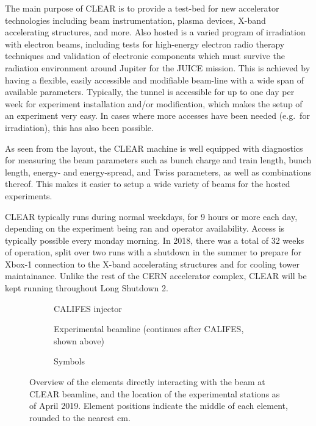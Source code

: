 \documentclass[a4paper,
               keeplastbox,   %
               ]{jacow}
\begin{document}
The main purpose of CLEAR is to provide a test-bed for new accelerator technologies including beam instrumentation, plasma devices, X-band accelerating structures, and more.
Also hosted is a varied program of irradiation with electron beams, including tests for high-energy electron radio therapy techniques and validation of electronic components which must survive the radiation environment around Jupiter for the JUICE mission.
This is achieved by having a flexible, easily accessible and modifiable beam-line with a wide span of available parameters.
Typically, the tunnel is accessible for up to one day per week for experiment installation and/or modification, which makes the setup of an experiment very easy.
In cases where more accesses have been needed (e.g.\ for irradiation), this has also been possible.


As seen from the layout, the CLEAR machine is well equipped with diagnostics for measuring the beam parameters such as bunch charge and train length, bunch length, energy- and energy-spread, and Twiss parameters, as well as combinations thereof.
This makes it easier to setup a wide variety of beams for the hosted experiments.

CLEAR typically runs during normal weekdays, for 9 hours or more each day, depending on the experiment being ran and operator availability.
Access is typically possible every monday morning.
In 2018, there was a total of 32 weeks of operation, split over two runs with a shutdown in the summer to prepare for Xbox-1 connection to the X-band accelerating structures and for cooling tower maintainance.
Unlike the rest of the CERN accelerator complex, CLEAR will be kept running throughout Long Shutdown 2.

\begin{figure*}[t]
  \centering
  \begin{subfigure}{\textwidth}
    \centering
    
    \vspace{-2.5em} %
    \caption{CALIFES injector}
  \end{subfigure}
  \begin{subfigure}{\textwidth}
    \centering
    \vspace{-1em}
    
    \vspace{-0.5em}
    \caption{Experimental beamline
      (continues after CALIFES, shown above)}
  \end{subfigure}
  \begin{subfigure}{\textwidth}
    \centering
    \vspace{-0.5em}
    
    \vspace{-2em} %
    \caption{Symbols}
  \end{subfigure}
  \caption{Overview of the elements directly interacting with the beam at CLEAR beamline, and the location of the experimental stations as of April 2019. Element positions indicate the middle of each element, rounded to the nearest cm.}
  \label{fig:layout}
\end{figure*}
\end{document}
